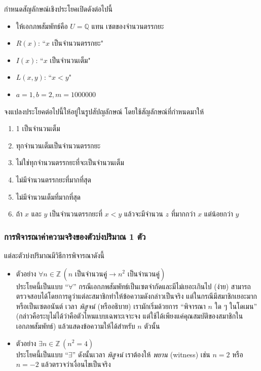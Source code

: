 \begin{exam}
	กำหนดสัญลักษณ์เชิงประโยคเปิดดังต่อไปนี้
	\begin{itemize}
		\item ให้เอกภพสัมพัทธ์คือ $U = \mathbb{Q}$ แทน เซตของจำนวนตรรกยะ
		\item $R(x)$: ``$x$ เป็นจำนวนตรรกยะ"
		\item $I(x)$: ``$x$ เป็นจำนวนเต็ม"
		\item $L(x,y)$: ``$x<y$"
		\item $a=1, b=2, m=1000000$
	\end{itemize}
	
	จงแปลงประโยคต่อไปนี้ให้อยู่ในรูปสัปญลักษณ์ โดยใช้สัญลักษณ์ที่กำหนดมาให้
	\begin{enumerate}
		\item 1 เป็นจำนวนเต็ม
		\item ทุกจำนวนเต็มเป็นจำนวนตรรกยะ
		\item ไม่ใช่ทุกจำนวนตรรกยะที่จะเป็นจำนวนเต็ม
		\item ไม่มีจำนวนตรรกยะที่มากที่สุด
		\item ไม่มีจำนวนเต็มที่มากที่สุด
		\item ถ้า $x$ และ $y$ เป็นจำนวนตรรกยะที่ $x<y$ แล้วจะมีจำนวน $z$ ที่มากกว่า $x$ แต่น้อยกว่า $y$
	\end{enumerate}
\end{exam}

\subsubsection{การพิจารณาค่าความจริงของตัวบ่งปริมาณ 1 ตัว}
แต่ละตัวบ่งปริมาณมีวิธีการพิจารณาดังนี้
\begin{itemize}
	\item ตัวอย่าง $\forall n\in \mathbb{Z}\,(n \text{ เป็นจำนวนคู่} \to n^2 \text{ เป็นจำนวนคู่})$ \\
	ประโยคนี้เป็นแบบ “$\forall$” กรณีเอกภพสัมพัทธ์เป็นเซตจำกัดและมีไม่เยอะเกินไป (ง่าย) สามารถตรวจสอบได้โดยการดูว่าแต่ละสมาชิกทำให้ข้อความดังกล่าวเป็นจริง แต่ในกรณีมีสมาชิกเยอะมากหรือเป็นเซตอนันต์ เวลา \emph{พิสูจน์} (หรืออธิบาย) เรามักเริ่มด้วยการ “พิจารณา $n$ ใด ๆ ในโดเมน” (กล่าวคือระบุไม่ได้ว่าคือตัวไหนแบบเฉพาะเจาะจง แต่ใช้ได้เพียงแค่คุณสมบัติของสมาชิกในเอกภพสัมพัทธ์) แล้วแสดงข้อความให้ได้สำหรับ $n$ ตัวนั้น
	\item ตัวอย่าง $\exists n\in \mathbb{Z}\,(n^2=4)$ \\
	ประโยคนี้เป็นแบบ “$\exists$” ดังนั้นเวลา \emph{พิสูจน์} เราต้องให้ \emph{พยาน} (witness) เช่น $n=2$ หรือ $n=-2$ แล้วตรวจว่าเงื่อนไขเป็นจริง
\end{itemize}

